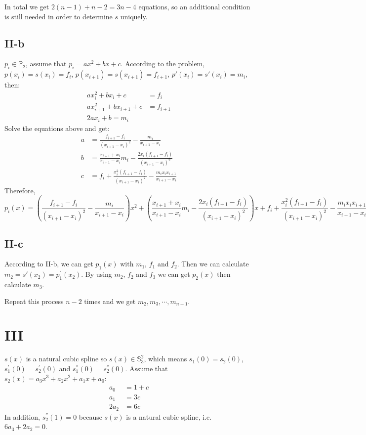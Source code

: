 \documentclass[a4paper]{article}
\begin{document}
In total we get $2(n-1)+n-2=3n-4$ equations, so an additional condition is still needed in order to determine $s$ uniquely.

\subsection*{II-b}
$p_i \in \mathbb{P}_2$, assume that $p_i = ax^2+bx+c$. According to the problem, $p(x_i) = s(x_i) = f_i$, $p(x_{i+1}) = s(x_{i+1}) = f_{i+1}$, $p'(x_i) = s'(x_i) = m_i$, then:
\begin{align*}
a x_i^2 + b x_i + c &= f_i \\
a x_{i+1}^2 + b x_{i+1} + c &= f_{i+1} \\
2a x_i + b = m_i
\end{align*}
Solve the equations above and get:
\begin{align*}
a &= \frac{f_{i+1}-f_i}{(x_{i+1}-x_i)^2} - \frac{m_i}{x_{i+1}-x_i} \\
b &= \frac{x_{i+1}+x_i}{x_{i+1}-x_i}m_i - \frac{2x_i(f_{i+1}-f_i)}{(x_{i+1}-x_i)^2} \\
c &= f_i + \frac{x_i^2 (f_{i+1}-f_i)}{(x_{i+1}-x_i)^2} - \frac{m_i x_i x_{i+1}}{x_{i+1} - x_i}
\end{align*}
Therefore, $p_i(x) = (\dfrac{f_{i+1}-f_i}{(x_{i+1}-x_i)^2} - \dfrac{m_i}{x_{i+1}-x_i})x^2 + (\dfrac{x_{i+1}+x_i}{x_{i+1}-x_i}m_i - \dfrac{2x_i(f_{i+1}-f_i)}{(x_{i+1}-x_i)^2})x +f_i + \dfrac{x_i^2 (f_{i+1}-f_i)}{(x_{i+1}-x_i)^2} - \dfrac{m_i x_i x_{i+1}}{x_{i+1} - x_i}$

\subsection*{II-c}
According to II-b, we can get $p_1(x)$ with $m_1$, $f_1$ and $f_2$. Then we can calculate $m_2 = s'(x_2) = p_1^{'}(x_2)$. By using $m_2$, $f_2$ and $f_3$ we can get $p_2(x)$ then calculate $m_3$.

Repeat this process $n-2$ times and we get $m_2,m_3,\cdots, m_{n-1}$.

\section*{III}
$s(x)$ is a natural cubic spline so $s(x) \in \mathbb{S}_3^2$, which means $s_1(0) = s_2(0)$, $s_1^{'}(0) = s_2^{'}(0)$ and $s_1^{''}(0) = s_2^{''}(0)$. Assume that $s_2(x) = a_3x^3+a_2x^2+a_1x+a_0$:
\begin{align*}
  a_0 &= 1+c \\
  a_1 &= 3c \\
  2a_2 &= 6c
\end{align*}
In addition, $s_2^{''}(1) = 0$ because $s(x)$ is a natural cubic spline, i.e. $6a_3+2a_2=0$.
\end{document}
